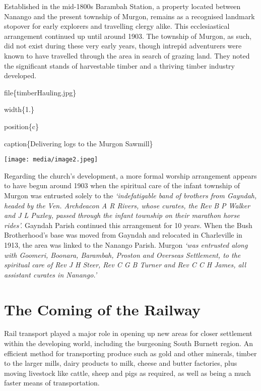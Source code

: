 Established in the mid-1800s Barambah Station, a property located between Nanango and the present township of Murgon, remains as a recognised landmark stopover for early explorers and travelling clergy alike. This ecclesiastical arrangement continued up until around 1903. The township of Murgon, as such, did not exist during these very early years, though intrepid adventurers were known to have travelled through the area in search of grazing land. They noted the significant stands of harvestable timber and a thriving timber industry developed.

file\{timberHauling.jpg\}

width\{1.\}

position\{c\}

caption\{Delivering logs to the Murgon Sawmill\}

\texttt{[image: media/image2.jpeg]}

Regarding the church's development, a more formal worship arrangement appears to have begun around 1903 when the spiritual care of the infant township of Murgon was entrusted solely to the \emph{`indefatigable band of brothers from Gayndah, headed by the Ven. Archdeacon A R Rivers, whose curates, the Rev B P Walker and J L Puxley, passed through the infant township on their marathon horse rides'.} Gayndah Parish continued this arrangement for 10 years. When the Bush Brotherhood's base was moved from Gayndah and relocated in Charleville in 1913, the area was linked to the Nanango Parish. Murgon \emph{`was entrusted along with Goomeri, Boonara, Barambah, Proston and Overseas Settlement, to the spiritual care of Rev J H Steer, Rev C G B Turner and Rev C C H James, all assistant curates in Nanango.'}

\hypertarget{the-coming-of-the-railway}{%
\section{The Coming of the Railway}\label{the-coming-of-the-railway}}

Rail transport played a major role in opening up new areas for closer settlement within the developing world, including the burgeoning South Burnett region. An efficient method for transporting produce such as gold and other minerals, timber to the larger mills, dairy products to milk, cheese and butter factories, plus moving livestock like cattle, sheep and pigs as required, as well as being a much faster means of transportation.

